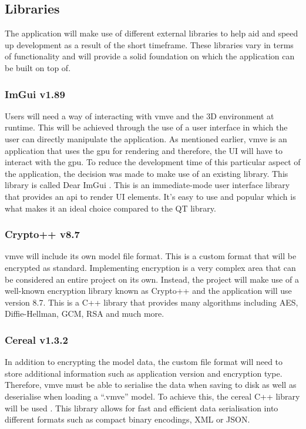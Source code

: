 \documentclass[11pt]{article}
\begin{document}
\subsection{Libraries}
The application will make use of different external libraries to help aid and
speed up development as a result of the short timeframe. These libraries vary in
terms of functionality and will provide a solid foundation on which the
application can be built on top of.

\subsubsection{ImGui v1.89}
Users will need a way of interacting with \gls*{vmve} and the 3D environment at
runtime. This will be achieved through the use of a user interface in which the
user can directly manipulate the application. As mentioned earlier, \gls*{vmve}
is an application that uses the \gls*{gpu} for rendering and therefore, the UI
will have to interact with the \gls*{gpu}. To reduce the development time of
this particular aspect of the application, the decision was made to make use of
an existing library. This library is called Dear ImGui \cite{imgui}. This is an
immediate-mode user interface library that provides an \gls*{api} to render UI
elements. It's easy to use and popular which is what makes it an ideal choice
compared to the QT library.

\subsubsection{Crypto++ v8.7} \label{custom_file_format}
\gls*{vmve} will include its own model file format. This is a custom format that
will be encrypted as standard. Implementing encryption is a very complex area
that can be considered an entire project on its own. Instead, the project will
make use of a well-known encryption library known as Crypto++ \cite{cryptopp}
and the application will use version 8.7. This is a C++ library that provides
many algorithms including AES, Diffie-Hellman, GCM, RSA and much more.

\subsubsection{Cereal v1.3.2}
In addition to encrypting the model data, the custom file format will need to
store additional information such as application version and encryption type.
Therefore, \gls*{vmve} must be able to serialise the data when saving to disk as
well as deserialise when loading a ``.vmve'' model. To achieve this, the cereal
C++ library will be used \cite{cereal}. This library allows for fast and
efficient data serialisation into different formats such as compact binary
encodings, XML or JSON.
\end{document}

